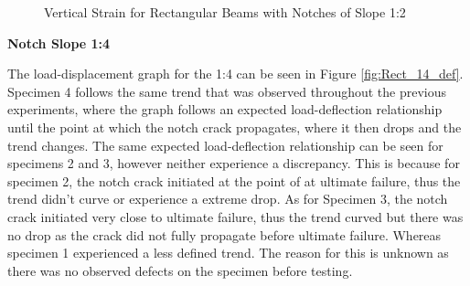 \documentclass[11pt,a4paper]{article}
\numberwithin{equation}{subsection}
\begin{document}
\begin{figure}[h]
	\begin{center}
	\end{center}
	\caption{Vertical Strain for Rectangular Beams with Notches of Slope 1:2}
	\label{fig:Rect_12_Y}
\end{figure}

\vspace*{\baselineskip}

\noindent
\textbf{Notch Slope 1:4}\par
\noindent
The load-displacement graph for the 1:4 can be seen in Figure \ref{fig:Rect_14_def}. Specimen 4 follows the same trend that was observed throughout the previous experiments, where the graph follows an expected load-deflection relationship until the point at which the notch crack propagates, where it then drops and the trend changes. The same expected load-deflection relationship can be seen for specimens 2 and 3, however neither experience a discrepancy. This is because for specimen 2, the notch crack initiated at the point of at ultimate failure, thus the trend didn't curve or experience a extreme drop. As for Specimen 3, the notch crack initiated very close to ultimate failure, thus the trend curved but there was no drop as the crack did not fully propagate before ultimate failure. Whereas specimen 1 experienced a less defined trend. The reason for this is unknown as there was no observed defects on the specimen before testing.

\vspace*{\baselineskip}
\end{document}
